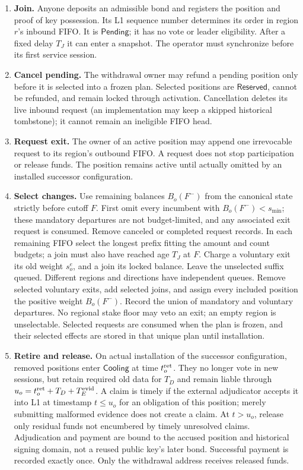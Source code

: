 \documentclass[11pt,a4paper]{article}
\newcommand{\Tag}[1]{\ensuremath{\mathsf{#1}}}
\begin{document}
\begin{enumerate}[label=\textbf{S\arabic*.},itemsep=4pt]
\item \textbf{Join.} Anyone deposits an admissible bond and registers the
position and proof of key possession. Its L1 sequence number determines
its order in region $r$'s inbound FIFO. It is \Tag{Pending}; it has no vote
or leader eligibility. After a fixed delay $T_J$ it can enter a snapshot.
The operator must synchronize before its first service session.
\item \textbf{Cancel pending.} The withdrawal owner may refund a pending
position only before it is selected into a frozen plan. Selected positions
are \Tag{Reserved}, cannot be refunded, and remain locked through activation.
Cancellation deletes its live inbound request (an implementation may keep
a skipped historical tombstone); it cannot remain an ineligible FIFO head.
\item \textbf{Request exit.} The owner of an active position may append one
irrevocable request to its region's outbound FIFO. A request does not stop
participation or release funds. The position remains active until actually
omitted by an installed successor configuration.
\item \textbf{Select changes.} Use remaining balances $B_o(F^-)$ from
the canonical state strictly before cutoff $F$. First omit every incumbent
with $B_o(F^-)<s_{\min}$; these mandatory departures are not budget-limited,
and any associated exit request is consumed. Remove canceled or completed
request records. In each remaining FIFO select the longest prefix fitting
the amount and count budgets; a join must also have reached age $T_J$ at
$F$. Charge a voluntary exit its old weight $s_o^e$, and a join its locked
balance. Leave the unselected suffix queued. Different regions and
directions have independent queues. Remove selected voluntary exits,
add selected joins, and assign every included position the positive weight
$B_o(F^-)$. Record the union of mandatory and voluntary departures.
No regional stake floor may veto an exit; an empty region is unselectable.
Selected requests are consumed when the plan is frozen, and their selected
effects are stored in that unique plan until installation.
\item \textbf{Retire and release.} On actual installation of the successor
configuration, removed positions enter \Tag{Cooling} at time $t_o^{\rm ret}$.
They no longer vote in new sessions, but retain required old data for
$T_D$ and remain liable through $u_o=t_o^{\rm ret}+T_D+T_E^{\rm evid}$.
A claim is timely if the external adjudicator accepts it into L1 at timestamp
$t\le u_o$ for an obligation of this position; merely submitting malformed
evidence does not create a claim. At $t>u_o$, release only residual funds
not encumbered by timely unresolved claims. Adjudication and payment are
bound to the accused position and historical signing domain, not a reused
public key's later bond. Successful payment is recorded exactly once.
Only the withdrawal address receives released funds.
\end{enumerate}
\end{document}
